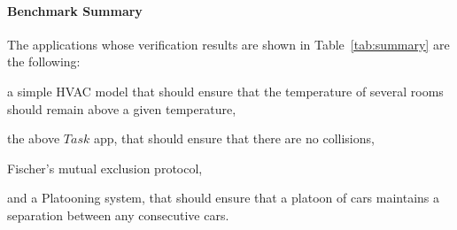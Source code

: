 \paragraph*{Benchmark Summary}
The applications whose verification results are shown in Table~\ref{tab:summary} are the following:

\begin{inparaenum}[(i)]
\item a simple HVAC model that should ensure that the temperature of several rooms should remain above a  given temperature, 
\item  the above $\mathit{Task}$ app, that should ensure that there are no collisions, 
\item Fischer's mutual exclusion protocol, 
\item and a Platooning system, that should ensure that a platoon of cars maintains a separation between any consecutive cars. 
\end{inparaenum}

